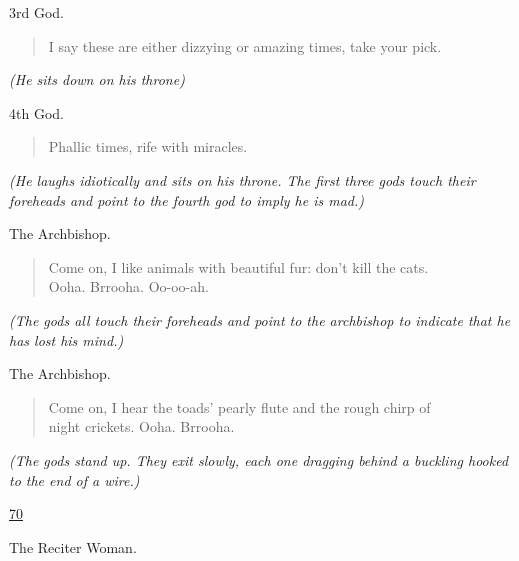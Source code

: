 \documentclass[letterpaper,article,12pt,oneside,notitlepage]{memoir}
\begin{document}
\begin{center}3rd God.\end{center}

\begin{verse}
I say these are either dizzying or amazing times, take your pick. \\
\end{verse}

\textit{(He sits down on his throne)}

\begin{center}4th God.\end{center}

\begin{verse}
Phallic times, rife with miracles. \\
\end{verse}

\textit{(He laughs idiotically and sits on his throne. The first three gods touch their foreheads and point to the fourth god to imply he is mad.)}

\begin{center}The Archbishop.\end{center}

\begin{verse}
Come on, I like animals with beautiful fur: don't kill the cats. \\
Ooha. Brrooha. Oo-oo-ah. \\
\end{verse}

\textit{(The gods all touch their foreheads and point to the archbishop to indicate that he has lost his mind.)}

\begin{center}The Archbishop.\end{center}

\begin{verse}
Come on, I hear the toads' pearly flute and the rough chirp of \\
night crickets. Ooha. Brrooha. \\
\end{verse}

\textit{(The gods stand up. They exit slowly, each one dragging behind a buckling hooked to the end of a wire.)}

\clearpage

\href{http://cesaire.elotroalex.com/chiens/chiens/p070.html}{70}

\begin{center}The Reciter Woman.\end{center}
\end{document}
